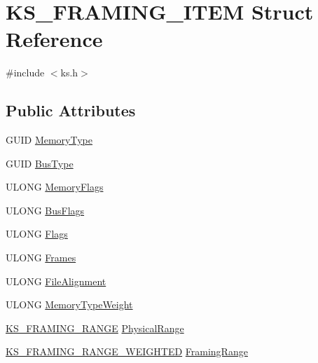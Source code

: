 \hypertarget{struct_k_s___f_r_a_m_i_n_g___i_t_e_m}{}\section{K\+S\+\_\+\+F\+R\+A\+M\+I\+N\+G\+\_\+\+I\+T\+EM Struct Reference}
\label{struct_k_s___f_r_a_m_i_n_g___i_t_e_m}


{\ttfamily \#include $<$ks.\+h$>$}

\subsection*{Public Attributes}
\begin{DoxyCompactItemize}
\item 
G\+U\+ID \hyperlink{struct_k_s___f_r_a_m_i_n_g___i_t_e_m_a5423848afda740337946226d341e6b86}{Memory\+Type}
\item 
G\+U\+ID \hyperlink{struct_k_s___f_r_a_m_i_n_g___i_t_e_m_adb188ca27e6bf1aa7401af7c83d18f4b}{Bus\+Type}
\item 
U\+L\+O\+NG \hyperlink{struct_k_s___f_r_a_m_i_n_g___i_t_e_m_a2e213c10a840ac1d24cced20c24a2894}{Memory\+Flags}
\item 
U\+L\+O\+NG \hyperlink{struct_k_s___f_r_a_m_i_n_g___i_t_e_m_a53ad79998621b3806e74febc8ee19ecd}{Bus\+Flags}
\item 
U\+L\+O\+NG \hyperlink{struct_k_s___f_r_a_m_i_n_g___i_t_e_m_ad511f9aa589a6ffb5484558730cfe92d}{Flags}
\item 
U\+L\+O\+NG \hyperlink{struct_k_s___f_r_a_m_i_n_g___i_t_e_m_a324ce02a53180de95a598e153c474dea}{Frames}
\item 
U\+L\+O\+NG \hyperlink{struct_k_s___f_r_a_m_i_n_g___i_t_e_m_ae6a905a4ce7f06859fe6b0d4fb9af782}{File\+Alignment}
\item 
U\+L\+O\+NG \hyperlink{struct_k_s___f_r_a_m_i_n_g___i_t_e_m_a52c977fa93d968fb8e8c1286854690b7}{Memory\+Type\+Weight}
\item 
\hyperlink{struct_k_s___f_r_a_m_i_n_g___r_a_n_g_e}{K\+S\+\_\+\+F\+R\+A\+M\+I\+N\+G\+\_\+\+R\+A\+N\+GE} \hyperlink{struct_k_s___f_r_a_m_i_n_g___i_t_e_m_a06823370f24c9d5bbb3e22db619a0411}{Physical\+Range}
\item 
\hyperlink{struct_k_s___f_r_a_m_i_n_g___r_a_n_g_e___w_e_i_g_h_t_e_d}{K\+S\+\_\+\+F\+R\+A\+M\+I\+N\+G\+\_\+\+R\+A\+N\+G\+E\+\_\+\+W\+E\+I\+G\+H\+T\+ED} \hyperlink{struct_k_s___f_r_a_m_i_n_g___i_t_e_m_afead0f728d577cc7ddb6d18666d4090c}{Framing\+Range}
\end{DoxyCompactItemize}



